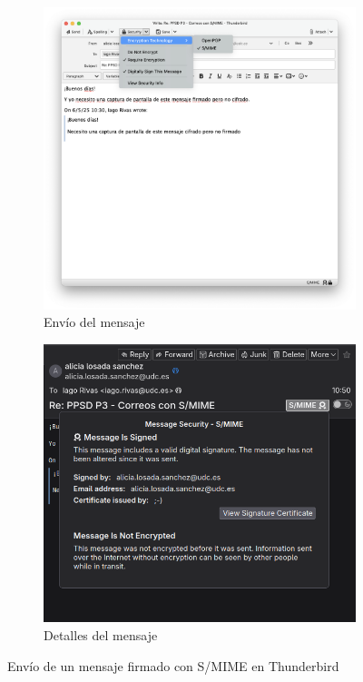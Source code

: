 \begin{figure}[H]
    \centering
    \begin{subfigure}{.5\textwidth}
        \centering
        \includegraphics[width=\linewidth]{thunderbird-smime-firmado.png}
        \caption{Envío del mensaje}
    \end{subfigure}%
    \begin{subfigure}{.5\textwidth}
        \centering
        \includegraphics[width=1.2\linewidth]{thunderbird-smime-detalles-firmado.png}
        \caption{Detalles del mensaje}
    \end{subfigure}
    \caption{Envío de un mensaje firmado con S/MIME en Thunderbird}
\end{figure}

